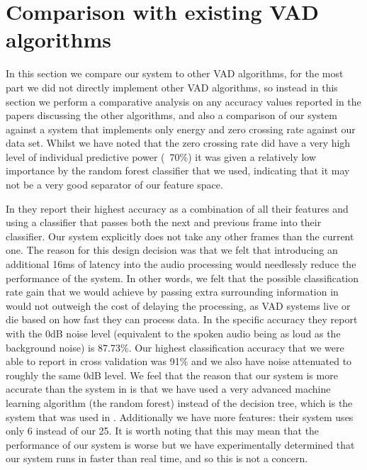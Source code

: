 \documentclass[ %
                    author={Sam Phippen},
                supervisor={Dr. Rafal Bogacz},
                     title={Real time voice activity detectors in noisy personal computing environments},
                  subtitle={},
                    degree={MEng},
                      year={2012} ]{thesis}
\begin{document}
\section{Comparison with existing VAD algorithms}

In this section we compare our system to other VAD algorithms, for the most
part we did not directly implement other VAD algorithms, so instead in this
section we perform a comparative analysis on any accuracy values reported in
the papers discussing the other algorithms, and also a comparison of our system
against a system that implements only energy and zero crossing rate against our
data set. Whilst we have noted that the zero crossing rate did have a very high
level of individual predictive power (~70\%) it was given a relatively low
importance by the random forest classifier that we used, indicating that it
may not be a very good separator of our feature space.

In \cite{shin} they report their highest accuracy as a combination of all their
features and using a classifier that passes both the next and previous frame
into their classifier. Our system explicitly does not take any other frames
than the current one. The reason for this design decision was that we felt that
introducing an additional 16ms of latency into the audio processing would
needlessly reduce the performance of the system. In other words, we felt that
the possible classification rate gain that we would achieve by passing extra
surrounding information in would not outweigh the cost of delaying the
processing, as VAD systems live or die based on how fast they can process data.
In \cite{shin} the specific accuracy they report with the 0dB noise level
(equivalent to the spoken audio being as loud as the background noise) is
87.73\%. Our highest classification accuracy that we were able to report in
cross validation was 91\% and we also have noise attenuated to roughly the same
0dB level.  We feel that the reason that our system is more accurate than the
system in \cite{shin} is that we have used a very advanced machine learning
algorithm (the random forest) instead of the decision tree, which is the system
that was used in \cite{11}. Additionally we have more features: their system
uses only 6 instead of our 25. It is worth noting that this may mean that the
performance of our system is worse but we have experimentally determined that
our system runs in faster than real time, and so this is not a concern.
\end{document}
